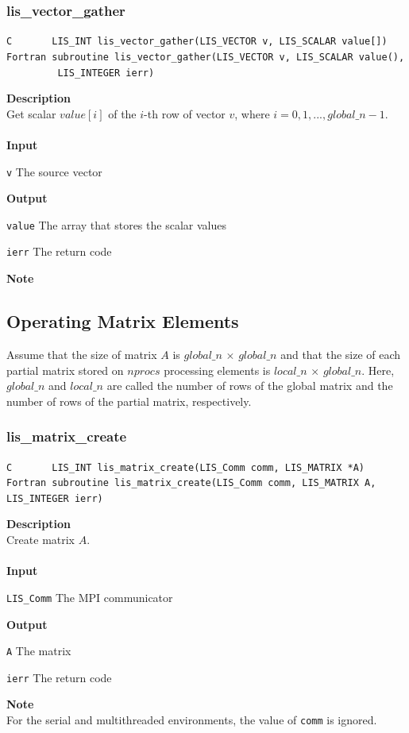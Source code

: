 \documentclass[a4paper]{article}
\newcommand{\namelistlabel}[1]{\mbox{#1}\hfill}
\newenvironment{namelist}[1]{%
\begin{list}{}
  {\let\makelabel\namelistlabel
  \settowidth{\labelwidth}{#1}
  \setlength{\leftmargin}{1.1\labelwidth}}
  }{%
\end{list}}
\begin{document}
\newpage
\subsubsection{lis\_vector\_gather}
\begin{screen}
\verb|C       LIS_INT lis_vector_gather(LIS_VECTOR v, LIS_SCALAR value[])|\\
\verb|Fortran subroutine lis_vector_gather(LIS_VECTOR v, LIS_SCALAR value(),|\\
\verb|         LIS_INTEGER ierr)|
\end{screen}
{\bf Description}\\
\indent
Get scalar $value[i]$ of the $i$-th row of vector $v$, 
where $i=0,1,..., global\_n-1$.
\\ \\
\noindent
{\bf Input}
\begin{namelist}{XXXXXXXXXXXXXXXXXXXX}
\item[\tt v] The source vector
\end{namelist}
{\bf Output}
\begin{namelist}{XXXXXXXXXXXXXXXXXXXX}
\item[\tt value] The array that stores the scalar values
\item[\tt ierr] The return code
\end{namelist}
{\bf Note}\\
\indent

\newpage
\subsection{Operating Matrix Elements}
Assume that the size of matrix $A$ is $global\_n$ $\times$ $global\_n$
and that the size of each partial matrix stored on $nprocs$ 
processing elements is $local\_n$ $\times$ $global\_n$. Here, $global\_n$
and $local\_n$ are called the number of rows of the global matrix
and the number of rows of the partial matrix, respectively. 
\subsubsection{lis\_matrix\_create}
\begin{screen}
\verb|C       LIS_INT lis_matrix_create(LIS_Comm comm, LIS_MATRIX *A)|
\verb|Fortran subroutine lis_matrix_create(LIS_Comm comm, LIS_MATRIX A, LIS_INTEGER ierr)|
\end{screen}
{\bf Description}\\
\indent
Create matrix $A$.
\\ \\
\noindent
{\bf Input}
\begin{namelist}{XXXXXXXXXXXXXXXXXXXX}
\item[\tt LIS\_Comm] The MPI communicator
\end{namelist}
{\bf Output}
\begin{namelist}{XXXXXXXXXXXXXXXXXXXX}
\item[\tt A] The matrix
\item[\tt ierr] The return code
\end{namelist}
{\bf Note}\\
\indent
For the serial and multithreaded environments, the value of {\tt comm} is ignored. 
\end{document}
